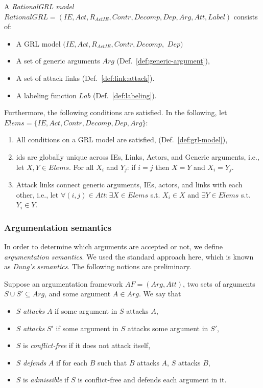 \begin{definition}
\label{def:rationalgrl-model}
A \emph{RationalGRL model} $RationalGRL=(IE, Act, R_{ActIE}, Contr, Decomp, Dep, Arg, Att, Label)$ consists of:
\begin{itemize}
\item A GRL model $(IE, Act, R_{ActIE}, Contr, Decomp,$ $Dep)$
\item A set of generic arguments $Arg$ (Def.~\ref{def:generic-argument}),
\item A set of attack links (Def.~\ref{def:link:attack}).
\item A labeling function $Lab$ (Def.~\ref{def:labeling}).
\end{itemize}

Furthermore, the following conditions are satisfied. In the following, let $Elems = \{IE, Act, Contr, Decomp, Dep, Arg\}$:
\begin{enumerate}
\item All conditions on a GRL model are satisfied, (Def.~\ref{def:grl-model}),
\item ids are globally unique across IEs, Links, Actors, and Generic arguments, i.e., let $X,Y\in Elems$. For all $X_i$ and $Y_j$: if $i=j$ then $X=Y$ and $X_i=Y_j$.
\item Attack links connect generic arguments, IEs, actors, and links with each other, i.e., let   $\forall (i,j)\in Att: \exists X\in Elems$ s.t. $X_i\in X$ and $\exists Y\in Elems$ s.t. $Y_i\in Y$.
\end{enumerate}
\end{definition}


\subsubsection{Argumentation semantics}

In order to determine which arguments are accepted or not, we define \emph{argumentation semantics}. We used the standard approach here, which is known as \emph{Dung's semantics}. The following notions are preliminary.

\begin{definition} Suppose an argumentation framework $AF=(Arg,Att)$, two sets of arguments $S\cup S'\subseteq Arg$, and some argument $A\in Arg$. We say that
\begin{itemize}
\item $S$ \emph{attacks} $A$ if some argument in $S$ attacks $A$,
\item $S$ \emph{attacks} $S'$ if some argument in $S$ attacks some argument in $S'$,
\item $S$ is \emph{conflict-free} if it does not attack itself,
\item $S$ \emph{defends} $A$ if for each $B$ such that $B$ attacks $A$, $S$ attacks $B$,
\item $S$ is \emph{admissible} if $S$ is conflict-free and defends each argument in it.
\end{itemize}
\end{definition}


